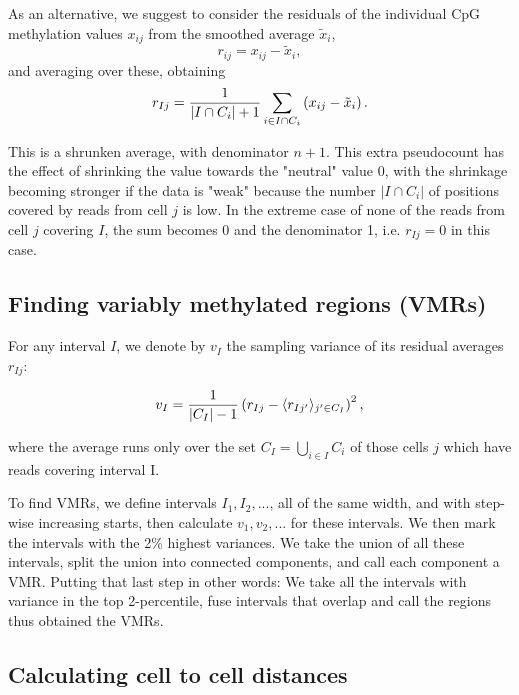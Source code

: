 \documentclass[twocolumn,10pt]{article}
\begin{document}
As an alternative, we suggest to consider the residuals of the individual CpG methylation values $x_{ij}$ from the smoothed average $\tilde x_i$,
$$ r_{ij} = x_{ij} - \tilde x_i, $$
and averaging over these, obtaining
\begin{equation} 
r_{Ij} = \frac{\scriptsize{1}}{\scriptsize{|I\cap C_i|+1}}\sum_{i\in I\cap C_i}\left( x_{ij} - \tilde x_i \right). \label{avgres}
\end{equation}

This is a shrunken average, with denominator $n+1$. This extra pseudocount has the effect of shrinking the value towards the "neutral" value 0, with the shrinkage becoming stronger if the data is "weak" because the number $|I\cap C_i|$ of positions covered by reads from cell $j$  is low. In the extreme case of none of the reads from cell $j$ covering $I$, the sum becomes 0 and the denominator 1, i.e. $r_{Ij}=0$ in this case.

\subsection{Finding variably methylated regions (VMRs)}

For any interval $I$, we denote by $v_I$ the sampling variance of its residual averages $r_{Ij}$:

$$ v_I = \frac{\scriptsize{1}}{\scriptsize{|C_I|-1}}\left( r_{Ij} - \langle r_{Ij'}\rangle_{j'\in C_I} \right)^2,$$

where the average runs only over the set $C_I=\bigcup_{i\in I}C_i$ of those cells $j$ which have reads covering interval I.

To find VMRs, we define intervals $I_1, I_2, ...$, all of the same width, and with step-wise increasing starts, then calculate $v_1, v_2, ...$ for these intervals. We then mark the intervals with the 2\% highest variances. We take the union of all these intervals, split the union into connected components, and call each component a VMR. Putting that last step in other words: We take all the intervals with variance in the top 2-percentile, fuse intervals that overlap and call the regions thus obtained the VMRs.

\subsection{Calculating cell to cell distances}
\end{document}
